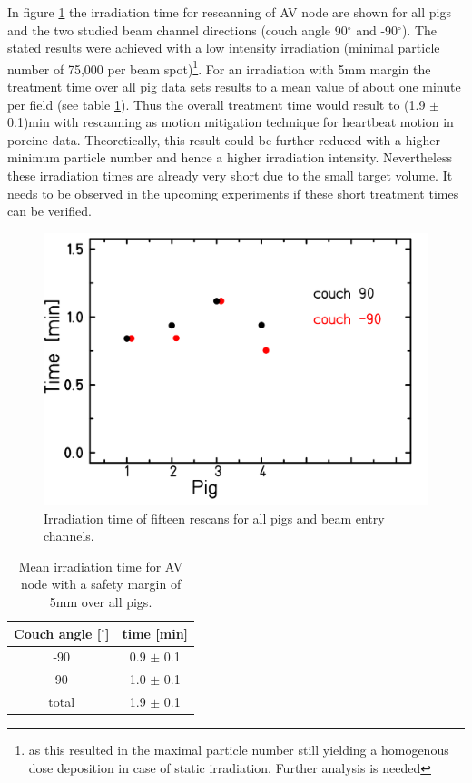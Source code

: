 In figure \ref{irrTime_rescan15} the irradiation time for rescanning of AV node are shown for all pigs and the two studied 
beam channel directions (couch angle 90$^{\circ}$ and -90$^{\circ}$). 
The stated results were achieved with a low intensity irradiation (minimal particle number of 75,000 per beam spot)\footnote{as this resulted 
in the maximal particle number still yielding a homogenous dose deposition in case of static irradiation. Further analysis is needed}. 
For an irradiation with 5mm margin 
the treatment time over all pig data sets results to a mean value of about one minute per field (see table \ref{tab:rescan_time:pigs}). 
Thus the overall treatment time would result to (1.9 $\pm$ 0.1)min with rescanning as motion mitigation technique for heartbeat motion 
in porcine data. Theoretically, this result could be further reduced with a higher minimum particle number and hence a higher irradiation 
intensity. Nevertheless these irradiation times are already very short due to the small target volume. It needs to be observed in 
the upcoming experiments if these short treatment times can be verified. 

\vspace*{0.5cm}

 \begin{figure}[H]
 \begin{center}
 \includegraphics[scale=0.2]{./teile/results_porcine/Rescan15_irrTime.png}
\caption{Irradiation time of fifteen rescans for all pigs and beam entry channels.}
\label{irrTime_rescan15}
 \end{center}
\end{figure}

\begin{table}[H]
  \centering
  \caption{Mean irradiation time for AV node with a safety margin of 5mm over all pigs.}
  \begin{tabular}{|c|c|}
    \hline\hline
    Couch angle [$^{\circ}$] & time [min] \\
    \hline
    -90 & 0.9 $\pm$ 0.1 \\
    90 & 1.0 $\pm$ 0.1 \\ \hline
    total & 1.9 $\pm$ 0.1 \\
    \hline\hline
    \end{tabular}
  \label{tab:rescan_time:pigs}
\end{table}


